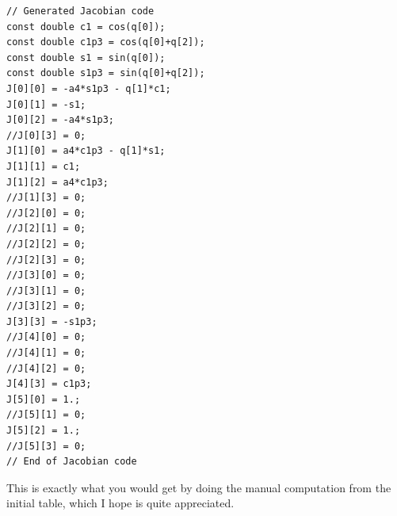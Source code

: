 \documentclass{ecnreport}
\begin{document}
\begin{minipage}{.1\linewidth}
	\quad\quad
\end{minipage}
\begin{minipage}{.45\linewidth}
\cppstyle \raggedright
\begin{lstlisting}
// Generated Jacobian code
const double c1 = cos(q[0]);
const double c1p3 = cos(q[0]+q[2]);
const double s1 = sin(q[0]);
const double s1p3 = sin(q[0]+q[2]);
J[0][0] = -a4*s1p3 - q[1]*c1;
J[0][1] = -s1;
J[0][2] = -a4*s1p3;
//J[0][3] = 0;
J[1][0] = a4*c1p3 - q[1]*s1;
J[1][1] = c1;
J[1][2] = a4*c1p3;
//J[1][3] = 0;
//J[2][0] = 0;
//J[2][1] = 0;
//J[2][2] = 0;
//J[2][3] = 0;
//J[3][0] = 0;
//J[3][1] = 0;
//J[3][2] = 0;
J[3][3] = -s1p3;
//J[4][0] = 0;
//J[4][1] = 0;
//J[4][2] = 0;
J[4][3] = c1p3;
J[5][0] = 1.;
//J[5][1] = 0;
J[5][2] = 1.;
//J[5][3] = 0;
// End of Jacobian code
\end{lstlisting}	
\end{minipage}
This is exactly what you would get by doing the manual computation from the initial table, which I hope is quite appreciated.
\end{document}
